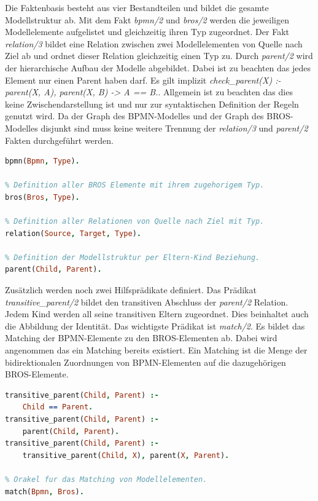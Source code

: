 Die Faktenbasis besteht aus vier Bestandteilen und bildet die gesamte Modellstruktur ab.
Mit dem Fakt \emph{bpmn/2} und \emph{bros/2} werden die jeweiligen Modellelemente aufgelistet und gleichzeitig ihren Typ zugeordnet.
Der Fakt \emph{relation/3} bildet eine Relation zwischen zwei Modellelementen von Quelle nach Ziel ab und ordnet dieser Relation gleichzeitig einen Typ zu.
Durch \emph{parent/2} wird der hierarchische Aufbau der Modelle abgebildet.
Dabei ist zu beachten das jedes Element nur einen Parent haben darf.
Es gilt implizit \emph{check\_parent(X) :- parent(X, A), parent(X, B) -> A == B.}.
Allgemein ist zu beachten das dies keine Zwischendarstellung ist und nur zur syntaktischen Definition der Regeln genutzt wird.
Da der Graph des BPMN-Modelles und der Graph des BROS-Modelles disjunkt sind muss keine weitere Trennung der \emph{relation/3} und \emph{parent/2} Fakten durchgeführt werden.

\begin{lstlisting}[language=Prolog, caption=Definitionen der Faktenbasis, label=lst:definition_facts]
% Definition aller BPMN Elemente mit ihrem zugehorigem Typ.
bpmn(Bpmn, Type).

% Definition aller BROS Elemente mit ihrem zugehorigem Typ.
bros(Bros, Type).

% Definition aller Relationen von Quelle nach Ziel mit Typ.
relation(Source, Target, Type).

% Definition der Modellstruktur per Eltern-Kind Beziehung.
parent(Child, Parent).
\end{lstlisting}

Zusätzlich werden noch zwei Hilfsprädikate definiert.
Das Prädikat \emph{transitive\_parent/2} bildet den transitiven Abschluss der \emph{parent/2} Relation.
Jedem Kind werden all seine transitiven Eltern zugeordnet.
Dies beinhaltet auch die Abbildung der Identität.
Das wichtigste Prädikat ist \emph{match/2}.
Es bildet das Matching der BPMN-Elemente zu den BROS-Elementen ab.
Dabei wird angenommen das ein Matching bereits existiert.
Ein Matching ist die Menge der bidirektionalen Zuordnungen von BPMN-Elementen auf die dazugehörigen BROS-Elemente. 

\begin{lstlisting}[language=Prolog, caption=Definitionen der weiterführenden Regeln, label=lst:definition_predicats]
% Transitiver Abschluss der Modellstruktur.
transitive_parent(Child, Parent) :- 
    Child == Parent.
transitive_parent(Child, Parent) :- 
    parent(Child, Parent).
transitive_parent(Child, Parent) :- 
    transitive_parent(Child, X), parent(X, Parent).

% Orakel fur das Matching von Modellelementen.
match(Bpmn, Bros).
\end{lstlisting}


